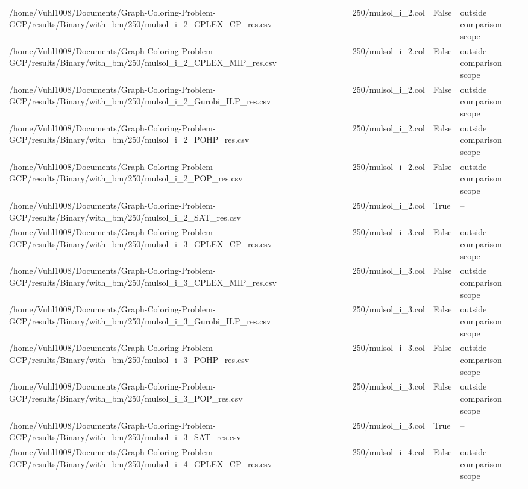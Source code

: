\begin{table}[htbp]
\begin{tabular}{llll}
/home/Vuhl1008/Documents/Graph-Coloring-Problem-GCP/results/Binary/with\_bm/250/mulsol\_i\_2\_CPLEX\_CP\_res.csv & 250/mulsol\_i\_2.col & False & outside comparison scope \\
/home/Vuhl1008/Documents/Graph-Coloring-Problem-GCP/results/Binary/with\_bm/250/mulsol\_i\_2\_CPLEX\_MIP\_res.csv & 250/mulsol\_i\_2.col & False & outside comparison scope \\
/home/Vuhl1008/Documents/Graph-Coloring-Problem-GCP/results/Binary/with\_bm/250/mulsol\_i\_2\_Gurobi\_ILP\_res.csv & 250/mulsol\_i\_2.col & False & outside comparison scope \\
/home/Vuhl1008/Documents/Graph-Coloring-Problem-GCP/results/Binary/with\_bm/250/mulsol\_i\_2\_POHP\_res.csv & 250/mulsol\_i\_2.col & False & outside comparison scope \\
/home/Vuhl1008/Documents/Graph-Coloring-Problem-GCP/results/Binary/with\_bm/250/mulsol\_i\_2\_POP\_res.csv & 250/mulsol\_i\_2.col & False & outside comparison scope \\
/home/Vuhl1008/Documents/Graph-Coloring-Problem-GCP/results/Binary/with\_bm/250/mulsol\_i\_2\_SAT\_res.csv & 250/mulsol\_i\_2.col & True & -- \\
/home/Vuhl1008/Documents/Graph-Coloring-Problem-GCP/results/Binary/with\_bm/250/mulsol\_i\_3\_CPLEX\_CP\_res.csv & 250/mulsol\_i\_3.col & False & outside comparison scope \\
/home/Vuhl1008/Documents/Graph-Coloring-Problem-GCP/results/Binary/with\_bm/250/mulsol\_i\_3\_CPLEX\_MIP\_res.csv & 250/mulsol\_i\_3.col & False & outside comparison scope \\
/home/Vuhl1008/Documents/Graph-Coloring-Problem-GCP/results/Binary/with\_bm/250/mulsol\_i\_3\_Gurobi\_ILP\_res.csv & 250/mulsol\_i\_3.col & False & outside comparison scope \\
/home/Vuhl1008/Documents/Graph-Coloring-Problem-GCP/results/Binary/with\_bm/250/mulsol\_i\_3\_POHP\_res.csv & 250/mulsol\_i\_3.col & False & outside comparison scope \\
/home/Vuhl1008/Documents/Graph-Coloring-Problem-GCP/results/Binary/with\_bm/250/mulsol\_i\_3\_POP\_res.csv & 250/mulsol\_i\_3.col & False & outside comparison scope \\
/home/Vuhl1008/Documents/Graph-Coloring-Problem-GCP/results/Binary/with\_bm/250/mulsol\_i\_3\_SAT\_res.csv & 250/mulsol\_i\_3.col & True & -- \\
/home/Vuhl1008/Documents/Graph-Coloring-Problem-GCP/results/Binary/with\_bm/250/mulsol\_i\_4\_CPLEX\_CP\_res.csv & 250/mulsol\_i\_4.col & False & outside comparison scope \\

\end{tabular}
\end{table}
